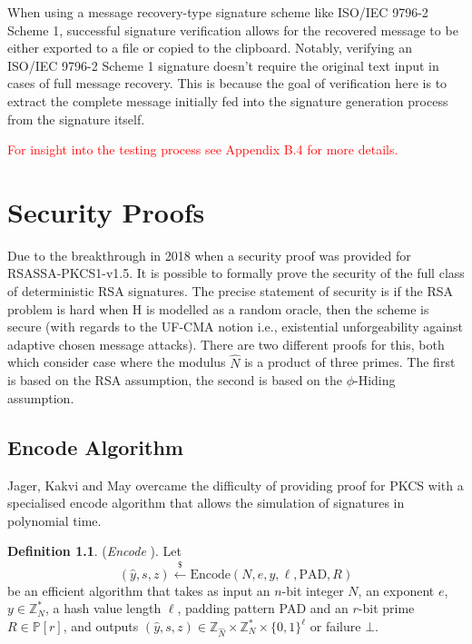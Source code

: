 \documentclass[]{final_report}
\theoremstyle{definition}
\newtheorem{definition}{Definition}[chapter]
\begin{document}
When using a message recovery-type signature scheme like ISO\slash IEC 9796-2 Scheme 1, successful signature verification allows for the recovered message to be either exported to a file or copied to the clipboard. Notably, verifying an ISO/IEC 9796-2 Scheme 1 signature doesn't require the original text input in cases of full message recovery. This is because the goal of verification here is to extract the complete message initially fed into the signature generation process from the signature itself.

\textcolor{red} {For insight into the testing process see Appendix B.4 for more details.}

\chapter{Security Proofs}
Due to the breakthrough in 2018 when a security proof \cite{jager2018security}  was provided for RSASSA-PKCS1-v1.5. It is possible to formally prove the security of the full class of deterministic RSA signatures. The precise statement of security is if the RSA problem is hard when H is modelled as a random oracle, then the scheme is secure (with regards to the UF-CMA notion i.e.,  existential unforgeability against adaptive chosen message attacks). There are two different proofs for this, both which consider case where the modulus $\widehat{N}$ is a product of three primes. The first is based on the RSA assumption, the second is based on the $\phi$-Hiding assumption.


\section{Encode Algorithm}


Jager, Kakvi and May overcame the difficulty of providing proof for PKCS with a specialised encode algorithm that allows the simulation of signatures in polynomial time.  

\begin{definition} (\textit{Encode} \cite{jager2018security}).
Let
\[
(\widehat{y}, s, z) \xleftarrow{\$} \text{Encode}(N, e, y, \ell, \text{PAD}, R)
\]
be an efficient algorithm that takes as input an \(n\)-bit integer \(N\), an exponent \(e\), \(y \in \mathbb{Z}_N^*\), a hash value length $\ell$, padding pattern PAD and an \(r\)-bit prime \(R \in \mathbb{P}[r]\), and outputs \((\widehat{y}, s, z) \in \mathbb{Z}_{\widehat{N}} \times \mathbb{Z}_N^* \times \{0, 1\}^\ell\) or failure \(\bot\). \

\end{definition}
\end{document}
